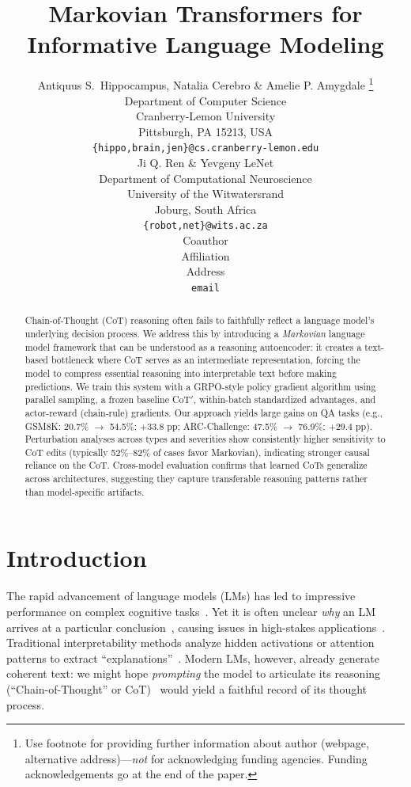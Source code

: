 \documentclass{article} %
\title{Markovian Transformers for Informative Language Modeling}
\author{Antiquus S.~Hippocampus, Natalia Cerebro \& Amelie P. Amygdale \thanks{ Use footnote for providing further information
about author (webpage, alternative address)---\emph{not} for acknowledging
funding agencies.  Funding acknowledgements go at the end of the paper.} \\
Department of Computer Science\\
Cranberry-Lemon University\\
Pittsburgh, PA 15213, USA \\
\texttt{\{hippo,brain,jen\}@cs.cranberry-lemon.edu} \\
\And
Ji Q. Ren \& Yevgeny LeNet \\
Department of Computational Neuroscience \\
University of the Witwatersrand \\
Joburg, South Africa \\
\texttt{\{robot,net\}@wits.ac.za} \\
\AND
Coauthor \\
Affiliation \\
Address \\
\texttt{email}
}
\begin{document}
\maketitle

\begin{abstract}
Chain-of-Thought (CoT) reasoning often fails to faithfully reflect a language model's underlying decision process. We address this by introducing a \emph{Markovian} language model framework that can be understood as a reasoning autoencoder: it creates a text-based bottleneck where CoT serves as an intermediate representation, forcing the model to compress essential reasoning into interpretable text before making predictions. We train this system with a GRPO-style policy gradient algorithm using parallel sampling, a frozen baseline CoT$'$, within-batch standardized advantages, and actor-reward (chain-rule) gradients. Our approach yields large gains on QA tasks (e.g., GSM8K: 20.7\% $\to$ 54.5\%; +33.8 pp; ARC-Challenge: 47.5\% $\to$ 76.9\%; +29.4 pp). Perturbation analyses across types and severities show consistently higher sensitivity to CoT edits (typically 52\%--82\% of cases favor Markovian), indicating stronger causal reliance on the CoT. Cross-model evaluation confirms that learned CoTs generalize across architectures, suggesting they capture transferable reasoning patterns rather than model-specific artifacts.
\end{abstract}

\section{Introduction}
\label{sec:intro}
The rapid advancement of language models (LMs) has led to impressive performance on complex cognitive tasks~\citep{NEURIPS2020_1457c0d6}. Yet it is often unclear \emph{why} an LM arrives at a particular conclusion~\citep{lamparth2023analyzing,burns2024discovering,gurnee2024language}, causing issues in high-stakes applications~\citep{Grabb2024.04.07.24305462,lamparth2024human,rivera2024escalation}. Traditional interpretability methods analyze hidden activations or attention patterns to extract ``explanations''~\citep{geiger2022inducing,geva2022transformer,meng2022locating,raukur2022toward,wang2022interpretability,lamparth2023analyzing,nanda2023progress}. Modern LMs, however, already generate coherent text: we might hope \emph{prompting} the model to articulate its reasoning (``Chain-of-Thought'' or CoT)~\citep{nye2022show,wei2022chain} would yield a faithful record of its thought process. 
\end{document}
